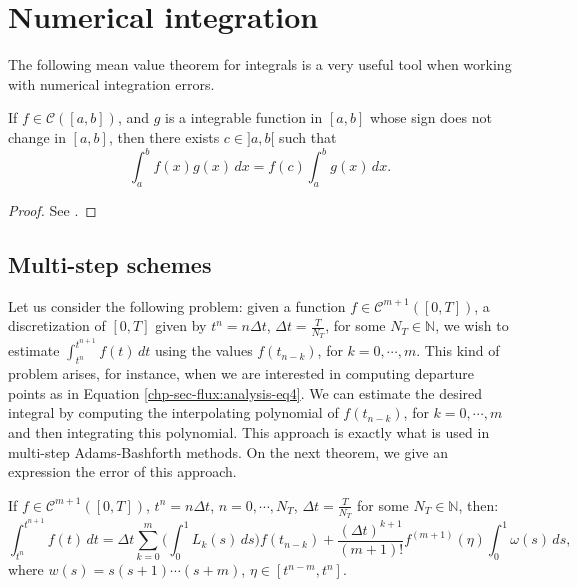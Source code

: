 \section{Numerical integration}
\label{anexo-numint}
The following mean value theorem for integrals is a very useful tool 
when working with numerical integration errors.
\begin{thrm}
	\label{anexo-numint-mv}
	If $f \in \mathcal{C}([a,b])$, and $g$ is a integrable function in $[a,b]$
	whose sign does not change in $[a,b]$,
	then there exists $c \in ]a,b[$ such that
	\begin{equation*}
		\int_{a}^{b}f(x)g(x) \,dx = f(c)\int_{a}^{b}g(x) \,dx.
	\end{equation*}
\end{thrm}
\begin{proof}
	See \citet[\pno~143]{courant:1999}.
\end{proof}


\subsection{Multi-step schemes}
Let us consider the following problem: given a function $f \in \mathcal{C}^{m+1}([0,T])$,
a discretization of $[0,T]$ given by $t^n= n\Delta t$, $\Delta t = \frac{T}{N_T}$, for some $N_T \in \mathbb{N}$, we wish
to estimate $\int_{t^n}^{t^{n+1}} f(t)\,dt$ using the values $f(t_{n-k})$, for $k=0,\cdots, m$.
This kind of problem arises, for instance, when we are interested in computing departure points as in Equation \ref{chp-sec-flux:analysis-eq4}.
We can estimate the desired integral by computing the interpolating polynomial of $f(t_{n-k})$, for $k=0,\cdots, m$ and
then integrating this polynomial.
This approach is exactly what is used in multi-step Adams-Bashforth methods.
On the next theorem, we give an expression the error of this approach.

\begin{thrm}
	\label{anexo-numint-adams}
	If $f\in \mathcal{C}^{m+1}([0,T])$, $t^n = n\Delta t$, $n=0, \cdots, N_T$, $\Delta t = \frac{T}{N_T}$ for some 
	$N_T \in \mathbb{N}$, then:
	\begin{equation}
		\label{anexo-numint-eq0}
		\int_{t^n}^{t^{n+1}} f(t)\,dt = \Delta t \sum_{k=0}^{m} \bigg(\int_{0}^{1} L_k(s) \,ds \bigg) f(t_{n-k})
		+ \frac{(\Delta t)^{k+1}}{(m+1)!} f^{(m+1)}(\eta)\int_{0}^{1} \omega(s)\,ds, 
	\end{equation}
where $w(s) = s(s+1)\cdots(s+m)$, $\eta \in [t^{n-m}, t^{n}]$.
\end{thrm}
	
